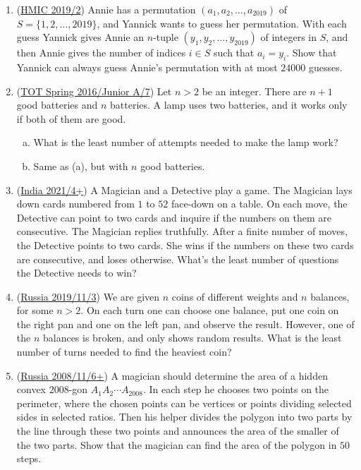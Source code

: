 \documentclass[11pt,paper=letter]{scrartcl}
\begin{document}
\begin{enumerate}

\item (\href{https://artofproblemsolving.com/community/c6h1829626p12247062}{HMIC 2019/2}) Annie has a permutation $(a_1, a_2, \dots ,a_{2019})$ of $S=\{1,2,\dots,2019\}$, and Yannick wants to guess her permutation. With each guess Yannick gives Annie an $n$-tuple $(y_1, y_2, \dots, y_{2019})$ of integers in $S$, and then Annie gives the number of indices $i\in S$ such that $a_i=y_i$. Show that Yannick can always guess Annie's permutation with at most $24000$ guesses.
\hint{\ref{h:1}}

\item (\href{https://artofproblemsolving.com/community/c6h1352101p7388263}{TOT Spring 2016/Junior A/7}) Let $n > 2$ be an integer. There are $n + 1$ good batteries and $n$ batteries. A lamp uses two batteries, and it works only if both of them are good.
\begin{enumerate}[(a)]
\item What is the least number of attempts needed to make the lamp work?
\item Same as (a), but with $n$ good batteries.
\end{enumerate}
\hint{\ref{h:2}}

\item (\href{https://artofproblemsolving.com/community/c6h2478238p20786985}{India 2021/4+}) A Magician and a Detective play a game. The Magician lays down cards numbered from $1$ to $52$ face-down on a table. On each move, the Detective can point to two cards and inquire if the numbers on them are consecutive. The Magician replies truthfully. After a finite number of moves, the Detective points to two cards. She wins if the numbers on these two cards are consecutive, and loses otherwise. What's the least number of questions the Detective needs to win?
\hint{\ref{h:3}}

\item (\href{https://artofproblemsolving.com/community/c6h1831665p12265499}{Russia 2019/11/3}) We are given $n$ coins of different weights and $n$ balances, for some $n > 2$. On each turn one can choose one balance, put one coin on the right pan and one on the left pan, and observe the result. However, one of the $n$ balances is broken, and only shows random results. What is the least number of turns needed to find the heaviest coin?
\hints{\ref{h:4} \ref{h:5}}

\item (\href{https://artofproblemsolving.com/community/c6h209617p1154356}{Russia 2008/11/6+}) A magician should determine the area of a hidden convex $2008$-gon $A_{1}A_{2} \cdots A_{2008}$. In each step he chooses two points on the perimeter, where the chosen points can be vertices or points dividing selected sides in selected ratios. Then his helper divides the polygon into two parts by the line through these two points and announces the area of the smaller of the two parts. Show that the magician can find the area of the polygon in $50$ steps.
\hints{\ref{h:6} \ref{h:7}}

\end{enumerate}
\end{document}
